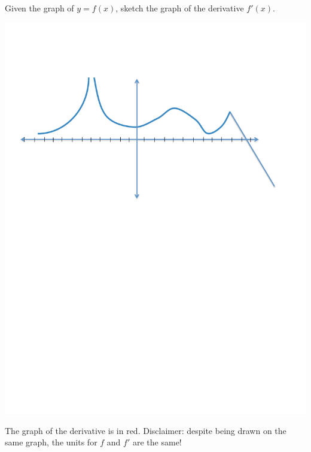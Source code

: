 \documentclass[nooutcomes]{ximera}
\begin{document}
\begin{problem}
Given the graph of $y=f(x)$, sketch the graph of the derivative $f'(x)$.

	\begin{image}
	\includegraphics[trim= 220 410 250 110]{Figure5.pdf}
	\end{image}

		\begin{freeResponse}
		The graph of the derivative is in red.  Disclaimer:  despite being drawn on the same graph, the units for $f$ and $f'$ are  the same!
		

\end{freeResponse}
\end{problem}
\end{document}
